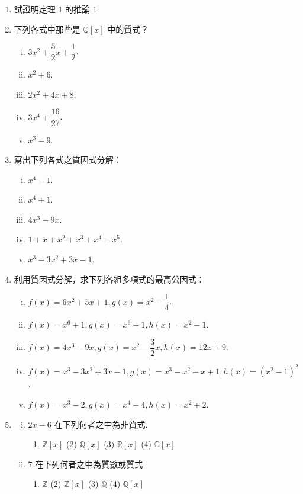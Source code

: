 \begin{enumerate}[1.]
  \item 試證明定理 1 的推論 1.

  \item 下列各式中那些是 $\mathbb{Q}[x]$ 中的質式？
  \begin{enumerate}[(i)]
    \item $3x^2+\dfrac{5}{2}x+\dfrac{1}{2}$.
    \item $x^2+6$.
    \item $2x^2+4x+8$.
    \item $3x^4+\dfrac{16}{27}$.
    \item $x^3-9$.
  \end{enumerate}

  \item 寫出下列各式之質因式分解：
  \begin{enumerate}[(i)]
    \item $x^4-1$.
    \item $x^4+1$.
    \item $4x^3-9x$.
    \item $1+x+x^2+x^3+x^4+x^5$.
    \item $x^3-3x^2+3x-1$.
  \end{enumerate}

  \item 利用質因式分解，求下列各組多項式的最高公因式：
  \begin{enumerate}[(i)]
    \item $f(x) = 6x^2+5x+1, g(x) = x^2-\dfrac{1}{4}$.
    \item $f(x) = x^6+1, g(x) = x^6-1, h(x) = x^2-1$.
    \item $f(x) = 4x^3-9x, g(x) = x^2-\dfrac{3}{2}x, h(x) = 12x+9$.
    \item $f(x) = x^3-3x^2+3x-1, g(x) = x^3-x^2-x+1, h(x) = (x^2-1)^2$.
    \item $f(x) = x^3-2, g(x) = x^4-4, h(x) = x^2+2$.
  \end{enumerate}

  \item 
  \begin{enumerate}[(i)]
    \item $2x-6$ 在下列何者之中為非質式.
    \begin{enumerate}[(1)]
      \item $\mathbb{Z}[x]$ \quad (2) $\mathbb{Q}[x]$ \quad (3) $\mathbb{R}[x]$ \quad (4) $\mathbb{C}[x]$
    \end{enumerate}
    \item $7$ 在下列何者之中為質數或質式
    \begin{enumerate}[(1)]
      \item $\mathbb{Z}$ \quad (2) $\mathbb{Z}[x]$ \quad (3) $\mathbb{Q}$ \quad (4) $\mathbb{Q}[x]$
    \end{enumerate}
  \end{enumerate}


\end{enumerate}

